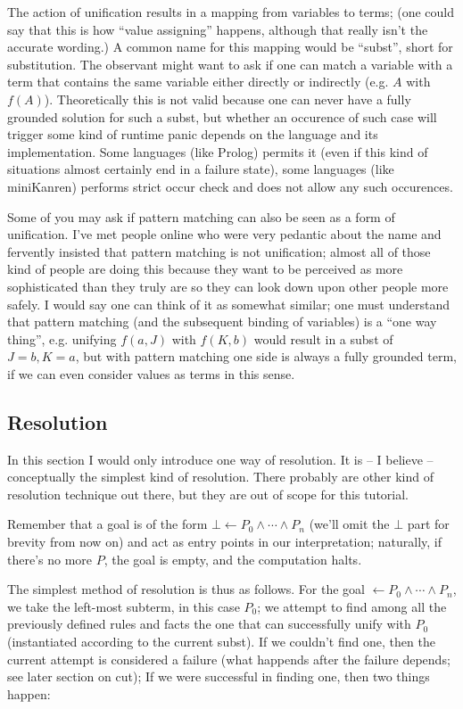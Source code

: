 The action of unification results in a mapping from variables to terms; (one could say that this is how ``value assigning'' happens, although that really isn't the accurate wording.) A common name for this mapping would be ``subst'', short for substitution. The observant might want to ask if one can match a variable with a term that contains the same variable either directly or indirectly (e.g. \(A\) with \(f(A)\)). Theoretically this is not valid because one can never have a fully grounded solution for such a subst, but whether an occurence of such case will trigger some kind of runtime panic depends on the language and its implementation. Some languages (like Prolog) permits it (even if this kind of situations almost certainly end in a failure state), some languages (like miniKanren) performs strict occur check and does not allow any such occurences.

Some of you may ask if pattern matching can also be seen as a form of unification. I've met people online who were very pedantic about the name and fervently insisted that pattern matching is not unification; almost all of those kind of people are doing this because they want to be perceived as more sophisticated than they truly are so they can look down upon other people more safely. I would say one can think of it as somewhat similar; one must understand that pattern matching (and the subsequent binding of variables) is a ``one way thing'', e.g. unifying \(f(a, J)\) with \(f(K, b)\) would result in a subst of \(J = b, K = a\), but with pattern matching one side is always a fully grounded term, if we can even consider values as terms in this sense.

\subsection{Resolution}
\label{sec:org22a1ade}

In this section I would only introduce one way of resolution. It is -- I believe -- conceptually the simplest kind of resolution. There probably are other kind of resolution technique out there, but they are out of scope for this tutorial.

Remember that a goal is of the form \(\bot \leftarrow P_0 \wedge \cdots \wedge P_n\) (we'll omit the \(\bot\) part for brevity from now on) and act as entry points in our interpretation; naturally, if there's no more \(P\), the goal is empty, and the computation halts.

The simplest method of resolution is thus as follows. For the goal \(\leftarrow P_0 \wedge \cdots \wedge P_n\), we take the left-most subterm, in this case \(P_0\); we attempt to find among all the previously defined rules and facts the one that can successfully unify with \(P_0\) (instantiated according to the current subst). If we couldn't find one, then the current attempt is considered a failure (what happends after the failure depends; see later section on cut); If we were successful in finding one, then two things happen:

